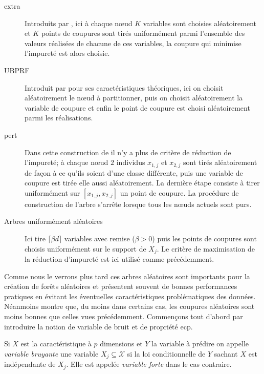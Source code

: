 \begin{description}
    \item[\ac{extra}]
    Introduits par \citet{Geurts2006}, ici à chaque nœud $K$ variables sont choisies aléatoirement et $K$ points de coupures sont tirés uniformément parmi l'ensemble des valeurs réalisées de chacune de ces variables, la coupure qui minimise l'impureté est alors choisie.
    \item[\ac{UBPRF}]
    Introduit par \citet{Breiman2001} pour ses caractéristiques théoriques, ici on choisit aléatoirement le nœud à partitionner, puis on choisit aléatoirement la variable de coupure et enfin le point de coupure est choisi aléatoirement parmi les réalisations.
    \item[\ac{pert}]
    Dans cette construction de \citet{Cutler2001} il n'y a plus de critère de réduction de l'impureté; à chaque nœud $2$ individus $x_{1,j}$ et $x_{2,j}$ sont tirés aléatoirement de façon à ce qu'ils soient d'une classe différente, puis une variable de coupure est tirée elle aussi aléatoirement. La dernière étape consiste à tirer uniformément sur $[x_{1,j},x_{2,j}]$ un point de coupure. La procédure de construction de l'arbre s'arrête lorsque tous les nœuds actuels sont purs.
    \item[Arbres uniformément aléatoires] 
    Ici \citet{Ciss2013} tire $\lceil \beta d \rceil$ variables avec remise ($\beta > 0$) puis les points de coupures sont choisis uniformément sur le support de $X_j$. Le critère de maximisation de la réduction d'impureté est ici utilisé comme précédemment.
\end{description}

Comme nous le verrons plus tard ces arbres aléatoires sont importants pour la création de forêts aléatoires et présentent souvent de bonnes performances pratiques en évitant les éventuelles caractéristiques problématiques des données. Néanmoins \citet{Ishwaran2014} montre que, du moins dans certains cas, les coupures aléatoires sont moins bonnes que celles vues précédemment. Commençons tout d'abord par introduire la notion de variable de bruit et de propriété \ac{ecp}.

\begin{definition}
    Si $X$ est la caractéristique à $p$ dimensions et $Y$ la variable à prédire on appelle \emph{variable bruyante} une variable $X_j \subseteq \mathcal{X}$ si la loi conditionnelle de $Y$ sachant $X$ est indépendante de $X_j$. Elle est appelée \emph{variable forte} dans le cas contraire.
\end{definition}

